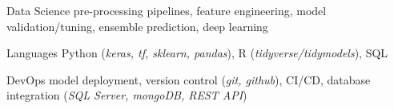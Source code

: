 

\begin{cvskills}

  \cvskill
    {Data Science} %
    {pre-processing pipelines, feature engineering, model validation/tuning, ensemble prediction, deep learning} %

  \cvskill
    {Languages} %
    {Python (\small\textit{keras, tf, sklearn, pandas}), R (\small\textit{tidyverse/tidymodels}), SQL} %

  \cvskill
    {DevOps} %
    {model deployment, version control (\small\textit{git, github}), CI/CD, database integration (\small\textit{SQL Server, mongoDB, REST API})} %
    
\end{cvskills}
